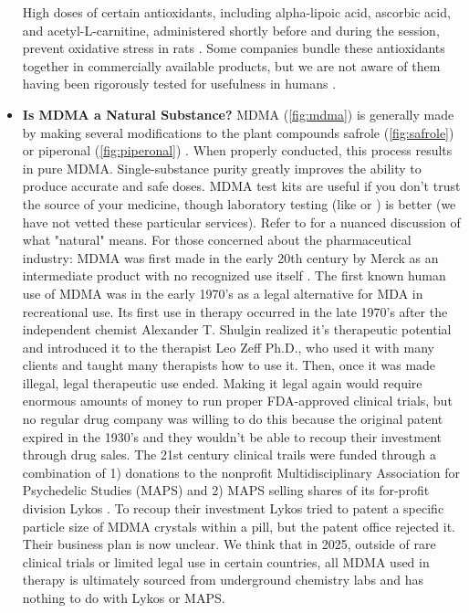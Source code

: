 \documentclass[12pt,letterpaper]{book}
\begin{document}
\begin{itemize}
        High doses of certain antioxidants, including alpha-lipoic acid, ascorbic acid, and acetyl-L-carnitine, administered shortly before and during the session, prevent oxidative stress in rats \cite{aguirre1999alpha,shankaran2001ascorbic,alves2009acetyl}. Some companies bundle these antioxidants together in commercially available products, but we are not aware of them having been rigorously tested for usefulness in humans \cite{rollKit}.
    \item \textbf{Is MDMA a Natural Substance?}
        MDMA (\ref{fig:mdma}) is generally made by making several modifications to the plant compounds safrole (\ref{fig:safrole}) or piperonal (\ref{fig:piperonal}) \cite{worldDrugReport,euMDMA}. When properly conducted, this process results in pure MDMA. Single-substance purity greatly improves the ability to produce accurate and safe doses. MDMA test kits are useful if you don't trust the source of your medicine, though laboratory testing (like \textcite{kykeonTesting} or \textcite{energyTesting}) is better (we have not vetted these particular services). Refer to \textcite{ruggeriNatural} for a nuanced discussion of what "natural" means. For those concerned about the pharmaceutical industry: MDMA was first made in the early 20th century by Merck as an intermediate product with no recognized use itself \cite{passieHistory}. The first known human use of MDMA was in the early 1970's as a legal alternative for MDA in recreational use. Its first use in therapy occurred in the late 1970's after the independent chemist Alexander T. Shulgin realized it's therapeutic potential and introduced it to the therapist Leo Zeff Ph.D., who used it with many clients and taught many therapists how to use it. Then, once it was made illegal, legal therapeutic use ended. Making it legal again would require enormous amounts of money to run proper FDA-approved clinical trials, but no regular drug company was willing to do this because the original patent expired in the 1930's and they wouldn't be able to recoup their investment through drug sales. The 21st century clinical trails were funded through a combination of 1) donations to the nonprofit Multidisciplinary Association for Psychedelic Studies (MAPS) and 2) MAPS selling shares of its for-profit division Lykos \cite{lykosPatents}. To recoup their investment Lykos tried to patent a specific particle size of MDMA crystals within a pill, but the patent office rejected it. Their business plan is now unclear. We think that in 2025, outside of rare clinical trials or limited legal use in certain countries, all MDMA used in therapy is ultimately sourced from underground chemistry labs and has nothing to do with Lykos or MAPS.

\end{itemize}
\end{document}
